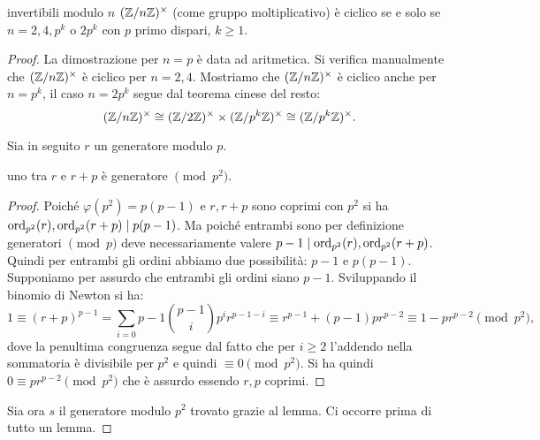 \begin{proposition}{invertibili modulo $n$}
    $(\mathbb{Z}/n\mathbb{Z})^\times$ (come gruppo moltiplicativo) è ciclico se e solo se $n = 2,4,p^k$ o $2p^k$ con $p$ primo dispari, $k \geq 1$.
\end{proposition}
\begin{proof}
    La dimostrazione per $n = p$ è data ad aritmetica. Si verifica manualmente che $(\mathbb{Z}/n\mathbb{Z})^\times$ è ciclico per $n=2, 4$. Mostriamo che $(\mathbb{Z}/n\mathbb{Z})^\times$ è ciclico anche per $n = p^k$, il caso $n = 2p^k$ segue dal teorema cinese del resto:
    \[
        (\mathbb{Z}/n\mathbb{Z})^\times \cong (\mathbb{Z}/2\mathbb{Z})^\times \times (\mathbb{Z}/p^k\mathbb{Z})^\times \cong (\mathbb{Z}/p^k\mathbb{Z})^\times.
    \]
    
    Sia in seguito $r$ un generatore modulo $p$.
    
    \begin{lemma2}
        uno tra $r$ e $r+p$ è generatore $\pmod{p^2}$.
    \end{lemma2}
    \begin{proof}
        Poiché $\varphi(p^2) = p(p-1)$ e $r,r+p$ sono coprimi con $p^2$ si ha $\text{ord}_{p^2}(r), \text{ord}_{p^2}(r+p) \mid p(p-1)$. Ma poiché entrambi sono per definizione generatori $\pmod{p}$ deve necessariamente valere $p-1  \mid  \text{ord}_{p^2}(r), \text{ord}_{p^2}(r+p)$. Quindi per entrambi gli ordini abbiamo due possibilità: $p-1$ e $p(p-1)$. Supponiamo per assurdo che entrambi gli ordini siano $p-1$. Sviluppando il binomio di Newton si ha:  \[ 1 \equiv (r + p)^{p-1} = \sum_{i=0}{p-1} \binom{p-1}{i}p^ir^{p-1-i} \equiv r^{p-1} + (p-1)pr^{p-2} \equiv 1 - pr^{p-2} \pmod{p^2}, \]
        dove la penultima congruenza segue dal fatto che per $i\geq 2$ l'addendo nella sommatoria è divisibile per $p^2$ e quindi $\equiv 0 \pmod{p^2}$. Si ha quindi $0 \equiv pr^{p-2} \pmod{p^2}$ che è assurdo essendo $r,p$ coprimi. 
    \end{proof}
    Sia ora $s$ il generatore modulo $p^2$ trovato grazie al lemma. Ci occorre prima di tutto un lemma.
    

\end{proof}
